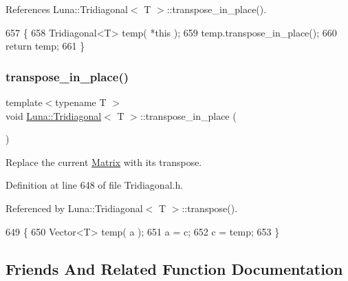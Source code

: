 References Luna\+::\+Tridiagonal$<$ T $>$\+::transpose\+\_\+in\+\_\+place().


\begin{DoxyCode}
657   \{
658     Tridiagonal<T> temp( *\textcolor{keyword}{this} );
659     temp.transpose\_in\_place();
660     \textcolor{keywordflow}{return} temp;
661   \}
\end{DoxyCode}
\mbox{\label{classLuna_1_1Tridiagonal_a97a6ebf42711983a047675211e2a277b}} 
\subsubsection{\texorpdfstring{transpose\+\_\+in\+\_\+place()}{transpose\_in\_place()}}
{\footnotesize\ttfamily template$<$typename T $>$ \\
void \hyperlink{classLuna_1_1Tridiagonal}{Luna\+::\+Tridiagonal}$<$ T $>$\+::transpose\+\_\+in\+\_\+place (\begin{DoxyParamCaption}{ }\end{DoxyParamCaption})\hspace{0.3cm}{\ttfamily [inline]}}



Replace the current \hyperlink{classLuna_1_1Matrix}{Matrix} with its transpose. 



Definition at line 648 of file Tridiagonal.\+h.



Referenced by Luna\+::\+Tridiagonal$<$ T $>$\+::transpose().


\begin{DoxyCode}
649   \{
650     Vector<T> temp( a );
651     a = c;
652     c = temp;
653   \}
\end{DoxyCode}


\subsection{Friends And Related Function Documentation}
\mbox{\label{classLuna_1_1Tridiagonal_abe10d406eb98ff667ab39c57ce8768be}} 
